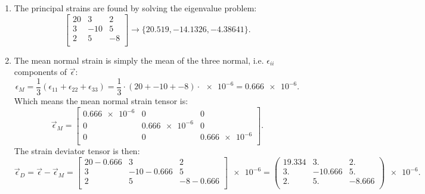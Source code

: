 \begin{derivation}
\begin{enumerate}
    \item[(b)] The principal strains are found by solving the eigenvalue problem:
      \begin{equation*}
\begin{bmatrix}
          20  & 3  & 2 \\
        3  & -10  & 5 \\
        2  & 5  & -8 \\
        \end{bmatrix} \rightarrow \{20.519,-14.1326,-4.38641\}
      .\end{equation*}
    \item[(c)] The mean normal strain is simply the mean of the three normal, i.e. $\epsilon_{ii}$ components of $\Vec{\epsilon}$:
      \begin{equation*}
        \epsilon_M = \frac{1}{3} \left( \epsilon_{11} + \epsilon_{22} + \epsilon_{33} \right) = \frac{1}{3} \cdot \left( 20 + \num{-10}  + \num{-8}  \right) \cdot \num{e-6}  = \num{0,666e-6} 
      .\end{equation*}
      Which means the mean normal strain tensor is:
      \begin{equation*}
        \Vec{\epsilon}_M = \begin{bmatrix}
          \num{0,666e-6}  & 0 & 0\\
        0 & \num{0,666e-6}  & 0\\
        0 & 0 & \num{0,666e-6} \\
        \end{bmatrix}
      .\end{equation*}
      The strain deviator tensor is then:
      \begin{equation*}
        \Vec{\epsilon}_D = \Vec{\epsilon} - \Vec{\epsilon}_M = \begin{bmatrix}
          20 - \num{0,666} & 3 & 2\\
        3 & -10 - \num{0,666}  & 5\\
        2 & 5 & -8 - \num{0,666} \\
        \end{bmatrix} \num{e-6} = \left(
\begin{array}{ccc}
 19.334 & 3. & 2. \\
 3. & -10.666 & 5. \\
 2. & 5. & -8.666 \\
\end{array}
\right) \num{e-6} 
      .\end{equation*}
  \end{enumerate}
\end{derivation}

